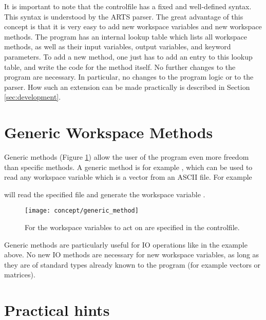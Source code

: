 It is important to note that the controlfile has a fixed and
well-defined syntax. This syntax is understood by the ARTS parser.
The great advantage of this concept is that it is very easy to add
new workspace variables and new workspace methods. The program has
an internal lookup table which lists all workspace methods, as well
as their input variables, output variables, and keyword
parameters. To add a new method, one just has to add an entry to
this lookup table, and write the code for the method itself. No
further changes to the program are necessary. In particular, no
changes to the program logic or to the parser. How such an extension
can be made practically is described in Section \ref{sec:development}.


\section{Generic Workspace Methods}
\label{sec:concept:generic}

Generic methods (Figure \ref{fig:generic_method}) allow the user of the
program even more freedom than specific methods. A generic method is
for example , which can be used to read any
workspace variable which is a vector from an ASCII file. For example
\begin{quote}
\end{quote}
will read the specified file and generate the workspace variable
.

\begin{figure}
  \begin{center}
    \texttt{[image: concept/generic\_method]}
    \caption{For  the workspace variables to act on are
        specified in the controlfile.}
    \label{fig:generic_method}
  \end{center}
\end{figure}

Generic methods are particularly useful for IO operations like in the
example above. No new IO methods are necessary for new workspace
variables, as long as they are of standard types already known to the
program (for example vectors or matrices). 

\section{Practical hints}
\label{sec:concept:practical}

